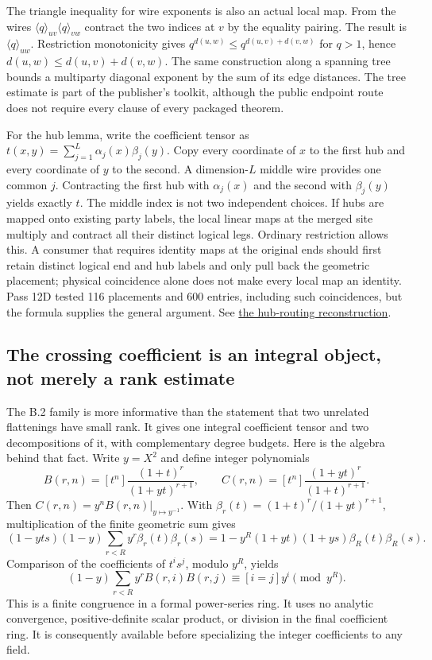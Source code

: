 \documentclass[11pt,letterpaper]{article}
\theoremstyle{definition}\newtheorem{definition}[theorem]{Definition}\newtheorem{example}[theorem]{Example}
\theoremstyle{remark}\newtheorem{remark}[theorem]{Remark}
\newcommand{\aud}[2]{\href{https://github.com/nousentllc/VP-VNP-Review/blob/567303d0bcf4f9d54390437b137752446e58ccd6/#1}{#2}}
\begin{document}
The triangle inequality for wire exponents is also an actual local map. From the wires $\langle q\rangle_{uv}\langle q\rangle_{vw}$ contract the two indices at $v$ by the equality pairing. The result is $\langle q\rangle_{uw}$. Restriction monotonicity gives $q^{d(u,w)}\le q^{d(u,v)+d(v,w)}$ for $q>1$, hence $d(u,w)\le d(u,v)+d(v,w)$. The same construction along a spanning tree bounds a multiparty diagonal exponent by the sum of its edge distances. The tree estimate is part of the publisher's toolkit, although the public endpoint route does not require every clause of every packaged theorem.

For the hub lemma, write the coefficient tensor as $t(x,y)=\sum_{j=1}^{L}\alpha_j(x)\beta_j(y)$. Copy every coordinate of $x$ to the first hub and every coordinate of $y$ to the second. A dimension-$L$ middle wire provides one common $j$. Contracting the first hub with $\alpha_j(x)$ and the second with $\beta_j(y)$ yields exactly $t$. The middle index is not two independent choices. If hubs are mapped onto existing party labels, the local linear maps at the merged site multiply and contract all their distinct logical legs. Ordinary restriction allows this. A consumer that requires identity maps at the original ends should first retain distinct logical end and hub labels and only pull back the geometric placement; physical coincidence alone does not make every local map an identity. Pass 12D tested 116 placements and 600 entries, including such coincidences, but the formula supplies the general argument. See \aud{passes/12d-hub-routing.md}{the hub-routing reconstruction}.

\subsection{The crossing coefficient is an integral object, not merely a rank estimate}\label{sec:crossdetail}
The B.2 family is more informative than the statement that two unrelated flattenings have small rank. It gives one integral coefficient tensor and two decompositions of it, with complementary degree budgets. Here is the algebra behind that fact. Write $y=X^2$ and define integer polynomials
\[
 B(r,n)=[t^n]\frac{(1+t)^r}{(1+yt)^{r+1}},\qquad
 C(r,n)=[t^n]\frac{(1+yt)^r}{(1+t)^{r+1}}.
\]
Then $C(r,n)=y^n B(r,n)|_{y\mapsto y^{-1}}$. With $\beta_r(t)=(1+t)^r/(1+yt)^{r+1}$, multiplication of the finite geometric sum gives
\[
 (1-yts)(1-y)\sum_{r<R}y^r\beta_r(t)\beta_r(s)
 =1-y^R(1+yt)(1+ys)\beta_R(t)\beta_R(s).
\]
Comparison of the coefficients of $t^i s^j$, modulo $y^R$, yields
\[
 (1-y)\sum_{r<R}y^rB(r,i)B(r,j)\equiv [i=j]y^i\pmod {y^R}.
\]
This is a finite congruence in a formal power-series ring. It uses no analytic convergence, positive-definite scalar product, or division in the final coefficient ring. It is consequently available before specializing the integer coefficients to any field.
\end{document}
